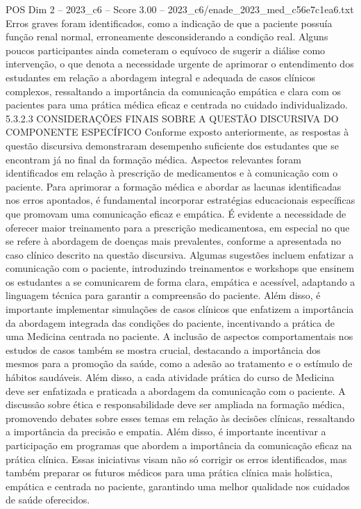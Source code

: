 \begin{textsample}{POS Dim 2 – 2023\_c6 – Score 3.00 – 2023\_c6/enade\_2023\_med\_c56e7c1ea6.txt}
Erros graves foram identificados, como a indicação de que a paciente possuía função renal normal, erroneamente desconsiderando a condição real.
Alguns poucos participantes ainda cometeram o equívoco de sugerir a diálise como intervenção, o que denota a necessidade urgente de aprimorar o entendimento dos estudantes em relação a abordagem integral e adequada de casos clínicos complexos, ressaltando a importância da comunicação empática e clara com os pacientes para uma prática médica eficaz e centrada no cuidado individualizado. 5.3.2.3 CONSIDERAÇÕES FINAIS SOBRE A QUESTÃO DISCURSIVA DO COMPONENTE ESPECÍFICO Conforme exposto anteriormente, as respostas à questão discursiva demonstraram desempenho suficiente dos estudantes que se encontram já no final da formação médica.
Aspectos relevantes foram identificados em relação à prescrição de medicamentos e à comunicação com o paciente.
Para aprimorar a formação médica e abordar as lacunas identificadas nos erros apontados, é fundamental incorporar estratégias educacionais específicas que promovam uma comunicação eficaz e empática.
É evidente a necessidade de oferecer maior treinamento para a prescrição medicamentosa, em especial no que se refere à abordagem de doenças mais prevalentes, conforme a apresentada no caso clínico descrito na questão discursiva.
Algumas sugestões incluem enfatizar a comunicação com o paciente, introduzindo treinamentos e workshops que ensinem os estudantes a se comunicarem de forma clara, empática e acessível, adaptando a linguagem técnica para garantir a compreensão do paciente.
Além disso, é importante implementar simulações de casos clínicos que enfatizem a importância da abordagem integrada das condições do paciente, incentivando a prática de uma Medicina centrada no paciente.
A inclusão de aspectos comportamentais nos estudos de casos também se mostra crucial, destacando a importância dos mesmos para a promoção da saúde, como a adesão ao tratamento e o estímulo de hábitos saudáveis.
Além disso, a cada atividade prática do curso de Medicina deve ser enfatizada e praticada a abordagem da comunicação com o paciente.
A discussão sobre ética e responsabilidade deve ser ampliada na formação médica, promovendo debates sobre esses temas em relação às decisões clínicas, ressaltando a importância da precisão e empatia.
Além disso, é importante incentivar a participação em programas que abordem a importância da comunicação eficaz na prática clínica.
Essas iniciativas visam não só corrigir os erros identificados, mas também preparar os futuros médicos para uma prática clínica mais holística, empática e centrada no paciente, garantindo uma melhor qualidade nos cuidados de saúde oferecidos.

\end{textsample}
